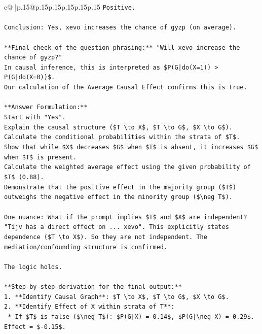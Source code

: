 \documentclass{article}
\begin{document}
{\begin{supertabular}{c@{$\;$}|p{.15\linewidth}@{}p{.15\linewidth}p{.15\linewidth}p{.15\linewidth}p{.15\linewidth}p{.15\linewidth}}
{{{\texttt{Positive.} \\
\\ 
\texttt{Conclusion: Yes, xevo increases the chance of gyzp (on average).} \\
\\ 
\texttt{**Final check of the question phrasing:** "Will xevo increase the chance of gyzp?"} \\
\texttt{In causal inference, this is interpreted as \$P(G|do(X=1)) > P(G|do(X=0))\$.} \\
\texttt{Our calculation of the Average Causal Effect confirms this is true.} \\
\\ 
\texttt{**Answer Formulation:**} \\
\texttt{Start with "Yes".} \\
\texttt{Explain the causal structure (\$T \textbackslash{}to X\$, \$T \textbackslash{}to G\$, \$X \textbackslash{}to G\$).} \\
\texttt{Calculate the conditional probabilities within the strata of \$T\$.} \\
\texttt{Show that while \$X\$ decreases \$G\$ when \$T\$ is absent, it increases \$G\$ when \$T\$ is present.} \\
\texttt{Calculate the weighted average effect using the given probability of \$T\$ (0.88).} \\
\texttt{Demonstrate that the positive effect in the majority group (\$T\$) outweighs the negative effect in the minority group (\$\textbackslash{}neg T\$).} \\
\\ 
\texttt{One nuance: What if the prompt implies \$T\$ and \$X\$ are independent?} \\
\texttt{"Tijv has a direct effect on ... xevo". This explicitly states dependence (\$T \textbackslash{}to X\$). So they are not independent. The mediation/confounding structure is confirmed.} \\
\\ 
\texttt{The logic holds.} \\
\\ 
\texttt{**Step{-}by{-}step derivation for the final output:**} \\
\texttt{1.  **Identify Causal Graph**: \$T \textbackslash{}to X\$, \$T \textbackslash{}to G\$, \$X \textbackslash{}to G\$.} \\
\texttt{2.  **Identify Effect of X within strata of T**:} \\
\texttt{    *   If \$T\$ is false (\$\textbackslash{}neg T\$): \$P(G|X) = 0.14\$, \$P(G|\textbackslash{}neg X) = 0.29\$. Effect = \${-}0.15\$.} \\
}}}
\end{supertabular}}
\end{document}
